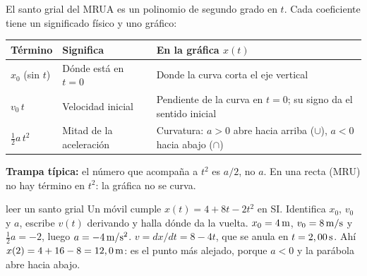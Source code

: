 \documentclass[11pt,a4paper]{article}
\begin{document}
El santo grial del MRUA es un polinomio de segundo grado en $t$. Cada coeficiente tiene
un significado f\'isico y uno gr\'afico:
\par\medskip
\begin{tabularx}{\linewidth}{@{}p{1.9cm}p{3.9cm}Y@{}}
\toprule
T\'ermino & Significa & En la gr\'afica $x(t)$\\
\midrule
$x_0$ (sin $t$) & D\'onde est\'a en $t=0$ & Donde la curva corta el eje vertical\\
$v_0\,t$ & Velocidad inicial & Pendiente de la curva en $t=0$; su signo da el sentido inicial\\
$\tfrac12a\,t^2$ & Mitad de la aceleraci\'on & Curvatura: $a>0$ abre hacia arriba ($\cup$), $a<0$ hacia abajo ($\cap$)\\
\bottomrule
\end{tabularx}
\par\medskip
\textbf{Trampa t\'ipica:} el n\'umero que acompa\~na a $t^2$ es $a/2$, no $a$.
En una recta (MRU) no hay t\'ermino en $t^2$: la gr\'afica no se curva.

\begin{exercisebox}{leer un santo grial}
Un m\'ovil cumple $x(t)=4+8t-2t^2$ en SI. Identifica $x_0$, $v_0$ y $a$, escribe
$v(t)$ derivando y halla d\'onde da la vuelta.
\solutionblock
$x_0=4\,\mathrm{m}$, $v_0=8\,\mathrm{m/s}$ y $\tfrac12a=-2$, luego $a=-4\,\mathrm{m/s^2}$.
$v=dx/dt=8-4t$, que se anula en $t=2,00\,\mathrm{s}$. Ah\'i $x(2)=4+16-8=12,0\,\mathrm{m}$:
es el punto m\'as alejado, porque $a<0$ y la par\'abola abre hacia abajo.
\end{exercisebox}
\end{document}

